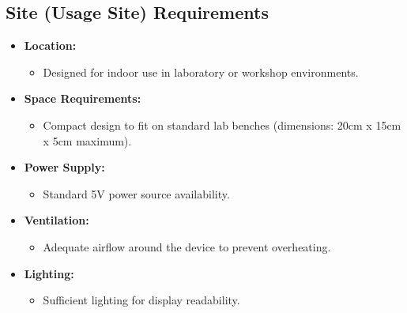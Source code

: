\documentclass[a4paper,12pt]{article}
\begin{document}
\subsection{Site (Usage Site) Requirements}
\begin{itemize}
    \item \textbf{Location:}
    \begin{itemize}
        \item Designed for indoor use in laboratory or workshop environments.
    \end{itemize}
    \item \textbf{Space Requirements:}
    \begin{itemize}
        \item Compact design to fit on standard lab benches (dimensions: 20cm x 15cm x 5cm maximum).
    \end{itemize}
    \item \textbf{Power Supply:}
    \begin{itemize}
        \item Standard 5V power source availability.
    \end{itemize}
    \item \textbf{Ventilation:}
    \begin{itemize}
        \item Adequate airflow around the device to prevent overheating.
    \end{itemize}
    \item \textbf{Lighting:}
    \begin{itemize}
        \item Sufficient lighting for display readability.
    \end{itemize}
\end{itemize}
\end{document}
